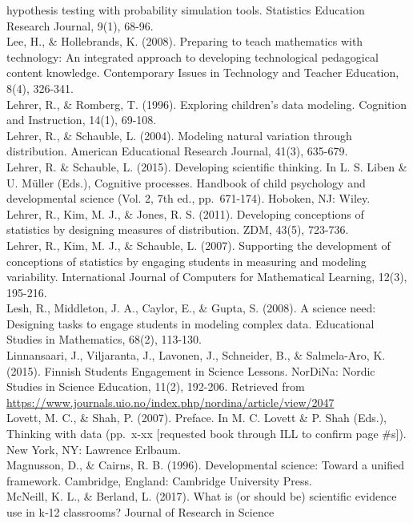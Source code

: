 \documentclass[]{msu-thesis}
\theoremstyle{definition}
\theoremstyle{definition}
\theoremstyle{definition}
\theoremstyle{remark}
\begin{document}
hypothesis testing with probability simulation tools. Statistics
Education Research Journal, 9(1), 68-96.\\
Lee, H., \& Hollebrands, K. (2008). Preparing to teach mathematics with
technology: An integrated approach to developing technological
pedagogical content knowledge. Contemporary Issues in Technology and
Teacher Education, 8(4), 326-341.\\
Lehrer, R., \& Romberg, T. (1996). Exploring children's data modeling.
Cognition and Instruction, 14(1), 69-108.\\
Lehrer, R., \& Schauble, L. (2004). Modeling natural variation through
distribution. American Educational Research Journal, 41(3), 635-679.\\
Lehrer, R. \& Schauble, L. (2015). Developing scientific thinking. In L.
S. Liben \& U. Müller (Eds.), Cognitive processes. Handbook of child
psychology and developmental science (Vol. 2, 7th ed., pp.~671-174).
Hoboken, NJ: Wiley.\\
Lehrer, R., Kim, M. J., \& Jones, R. S. (2011). Developing conceptions
of statistics by designing measures of distribution. ZDM, 43(5),
723-736.\\
Lehrer, R., Kim, M. J., \& Schauble, L. (2007). Supporting the
development of conceptions of statistics by engaging students in
measuring and modeling variability. International Journal of Computers
for Mathematical Learning, 12(3), 195-216.\\
Lesh, R., Middleton, J. A., Caylor, E., \& Gupta, S. (2008). A science
need: Designing tasks to engage students in modeling complex data.
Educational Studies in Mathematics, 68(2), 113-130.\\
Linnansaari, J., Viljaranta, J., Lavonen, J., Schneider, B., \&
Salmela-Aro, K. (2015). Finnish Students Engagement in Science Lessons.
NorDiNa: Nordic Studies in Science Education, 11(2), 192-206. Retrieved
from
\url{https://www.journals.uio.no/index.php/nordina/article/view/2047}\\
Lovett, M. C., \& Shah, P. (2007). Preface. In M. C. Lovett \& P. Shah
(Eds.), Thinking with data (pp.~x-xx {[}requested book through ILL to
confirm page \#s{]}). New York, NY: Lawrence Erlbaum.\\
Magnusson, D., \& Cairns, R. B. (1996). Developmental science: Toward a
unified framework. Cambridge, England: Cambridge University Press.\\
McNeill, K. L., \& Berland, L. (2017). What is (or should be) scientific
evidence use in k‐12 classrooms? Journal of Research in Science
\end{document}
